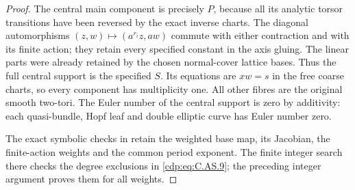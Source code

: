 \begin{proof}
The central main component is
precisely $P$, because all its
analytic torsor transitions have
been reversed by the exact inverse
charts. The diagonal automorphisms
$(z,w)\mapsto(a^{r_i}z,aw)$ commute
with either contraction and with
its finite action; they retain
every specified constant in the
axis gluing. The linear parts were
already retained by the chosen
normal-cover lattice bases.
Thus the full central support is
the specified $S$. Its equations
are $xw=s$ in the free coarse
charts, so every component has
multiplicity one. All other fibres
are the original smooth two-tori.
The Euler number of the central
support is zero by additivity:
each quasi-bundle, Hopf leaf and
double elliptic curve has Euler
number zero.

The exact symbolic checks in
retain the weighted base map, its
Jacobian, the finite-action weights
and the common period exponent.
The finite integer search there
checks the degree exclusions in
\eqref{cdp:eq:C.AS.9}; the preceding integer
argument proves them for all weights.
\end{proof}



